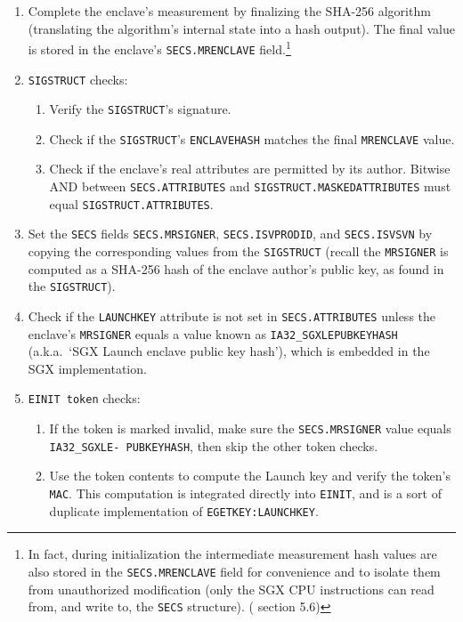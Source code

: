 \begin{enumerate}
    \item Complete the enclave's measurement by finalizing the SHA-256 algorithm (translating the algorithm's internal state into a hash output). The final value is stored in the enclave's {\tt SECS.MRENCLAVE} field.\footnote{In fact, during initialization the intermediate measurement hash values are also stored in the {\tt SECS.MRENCLAVE} field for convenience and to isolate them from unauthorized modification (only the SGX CPU instructions can read from, and write to, the {\tt SECS} structure). (\cite{intel-sgx-explained-advanced} section 5.6)}

    \item {\tt SIGSTRUCT} checks:
    \begin{enumerate}
        \item Verify the {\tt SIGSTRUCT}'s signature.

        \item Check if the {\tt SIGSTRUCT}'s {\tt ENCLAVEHASH} matches the final {\tt MRENCLAVE} value.

        \item Check if the enclave's real attributes are permitted by its author. Bitwise AND between {\tt SECS.ATTRIBUTES} and {\tt SIGSTRUCT.MASKEDATTRIBUTES} must equal {\tt SIGSTRUCT.ATTRIBUTES}.
    \end{enumerate}
    
    \item Set the {\tt SECS} fields {\tt SECS.MRSIGNER}, {\tt SECS.ISVPRODID}, and {\tt SECS.ISVSVN} by copying the corresponding values from the {\tt SIGSTRUCT} (recall the {\tt MRSIGNER} is computed as a SHA-256 hash of the enclave author's public key, as found in the {\tt SIGSTRUCT}).

    \item Check if the {\tt LAUNCHKEY} attribute is not set in {\tt SECS.ATTRIBUTES} unless the enclave's {\tt MRSIGNER} equals a value known as {\tt IA32\_SGXLEPUBKEYHASH} (a.k.a.\ `SGX Launch enclave public key hash'), which is embedded in the SGX implementation.

    \item {\tt EINIT token} checks:
    \begin{enumerate}
        \item If the token is marked invalid, make sure the {\tt SECS.MRSIGNER} value equals {\tt IA32\_SGXLE- PUBKEYHASH}, then skip the other token checks.

        \item Use the token contents to compute the Launch key and verify the token's {\tt MAC}. This computation is integrated directly into {\tt EINIT}, and is a sort of duplicate implementation of {\tt EGETKEY:LAUNCHKEY}.


\end{enumerate}
\end{enumerate}
